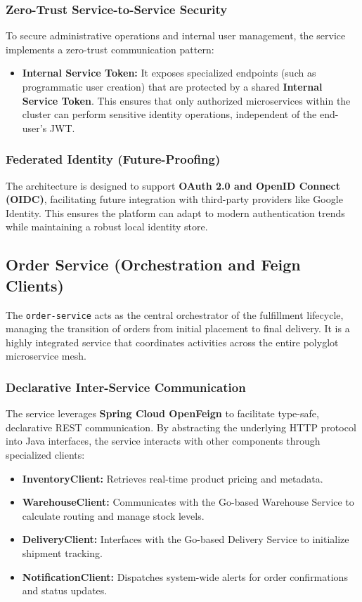 \documentclass[12pt,a4paper]{report}
\begin{document}
\subsubsection{Zero-Trust Service-to-Service Security}
To secure administrative operations and internal user management, the service implements a zero-trust communication pattern:
\begin{itemize}
    \item \textbf{Internal Service Token:} It exposes specialized endpoints (such as programmatic user creation) that are protected by a shared \textbf{Internal Service Token}. This ensures that only authorized microservices within the cluster can perform sensitive identity operations, independent of the end-user's JWT.
\end{itemize}

\subsubsection{Federated Identity (Future-Proofing)}
The architecture is designed to support \textbf{OAuth 2.0 and OpenID Connect (OIDC)}, facilitating future integration with third-party providers like Google Identity. This ensures the platform can adapt to modern authentication trends while maintaining a robust local identity store.

\subsection{Order Service (Orchestration and Feign Clients)}
The \texttt{order-service} acts as the central orchestrator of the fulfillment lifecycle, managing the transition of orders from initial placement to final delivery. It is a highly integrated service that coordinates activities across the entire polyglot microservice mesh.

\subsubsection{Declarative Inter-Service Communication}
The service leverages \textbf{Spring Cloud OpenFeign} to facilitate type-safe, declarative REST communication. By abstracting the underlying HTTP protocol into Java interfaces, the service interacts with other components through specialized clients:
\begin{itemize}
    \item \textbf{InventoryClient:} Retrieves real-time product pricing and metadata.
    \item \textbf{WarehouseClient:} Communicates with the Go-based Warehouse Service to calculate routing and manage stock levels.
    \item \textbf{DeliveryClient:} Interfaces with the Go-based Delivery Service to initialize shipment tracking.
    \item \textbf{NotificationClient:} Dispatches system-wide alerts for order confirmations and status updates.
\end{itemize}
\end{document}
